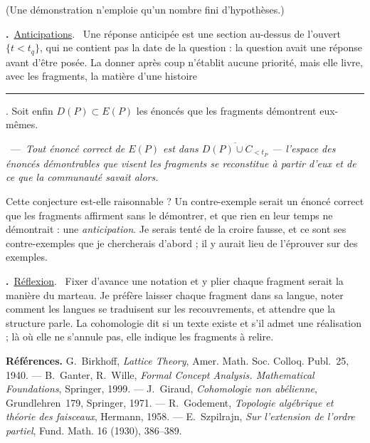 \documentclass[10pt]{article}
\newcommand{\Cl}[1]{\overline{#1}}
\newcommand{\cache}[1]{\setbox0\hbox{#1}\rule[-0.32ex]{\wd0}{1.02em}}
\newcounter{no}
\newcommand{\para}[1]{\par\medskip\stepcounter{no}\textbf{\arabic{no}.}\ \uline{#1}.\ }
\newcommand{\enonce}[2]{\par\smallskip{\bfseries #1}\ ---\ \textit{#2}\par\smallskip}
\begin{document}
(Une démonstration n'emploie qu'un nombre fini d'hypothèses.)

\para{Anticipations} Une réponse anticipée est une section au-dessus de l'ouvert $\{t < t_q\}$,
qui ne contient pas la date de la question : la question avait une réponse avant d'être posée.
La donner après coup n'établit aucune priorité, mais elle livre, avec les fragments, la matière
d'une \cache{histoire}. Soit enfin $D(P) \subset E(P)$ les énoncés que les fragments
démontrent eux-mêmes.

\enonce{Conjecture}{Tout énoncé correct de $E(P)$ est dans $\Cl{D(P) \cup C_{<t_P}}$ ---
l'espace des énoncés démontrables que visent les fragments se reconstitue à partir d'eux et de ce
que la communauté savait alors.}

Cette conjecture est-elle raisonnable ? Un contre-exemple serait un énoncé correct que les fragments affirment sans
le démontrer, et que rien en leur temps ne démontrait : une \emph{anticipation}. Je serais tenté
de la croire fausse, et ce sont ses contre-exemples que je chercherais d'abord ; il y aurait lieu de
l'éprouver sur des exemples.

\para{Réflexion} Fixer d'avance une notation et y plier chaque fragment serait la manière du marteau. Je préfère
laisser chaque fragment dans sa langue, noter comment les langues se traduisent sur les
recouvrements, et attendre que la structure parle. La cohomologie dit si un texte existe et s'il
admet une réalisation ; là où elle ne s'annule pas, elle indique les fragments à relire.

\vspace{0.3em}
{\small\textbf{Références.}
G.~Birkhoff, \emph{Lattice Theory}, Amer. Math. Soc. Colloq. Publ.~25, 1940. ---
B.~Ganter, R.~Wille, \emph{Formal Concept Analysis. Mathematical Foundations}, Springer, 1999. ---
J.~Giraud, \emph{Cohomologie non abélienne}, Grundlehren~179, Springer, 1971. ---
R.~Godement, \emph{Topologie algébrique et théorie des faisceaux}, Hermann, 1958. ---
E.~Szpilrajn, \emph{Sur l'extension de l'ordre partiel}, Fund. Math. 16 (1930), 386--389.\par}
\end{document}
